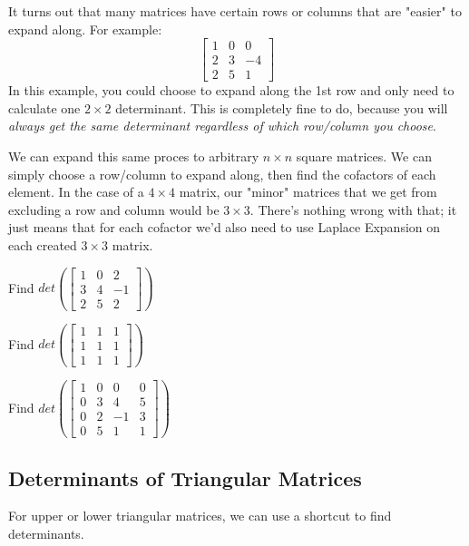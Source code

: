 \documentclass[11pt]{exam}
\begin{document}
    \pagebreak
    It turns out that many matrices have certain rows or columns that are "easier" to expand along. For example:
    $$\begin{bmatrix} 1 & 0 & 0 \\ 2 & 3 & -4 \\ 2 & 5 & 1 \end{bmatrix}$$
    In this example, you could choose to expand along the 1st row and only need to calculate one $2 \times 2$ determinant.
    This is completely fine to do, because you will \textit{always get the same determinant regardless of which row/column you choose}.

    We can expand this same proces to arbitrary $n \times n$ square matrices. We can simply choose a row/column to expand along, then find the cofactors
    of each element. In the case of a $4 \times 4$ matrix, our "minor" matrices that we get from excluding a row and column would be $3 \times 3$.
    There's nothing wrong with that; it just means that for each cofactor we'd also need to use Laplace Expansion on each created $3 \times 3$ matrix.

    \vspace{20px}
    \begin{questions}
        \item Find $det(\begin{bmatrix} 1 & 0 & 2 \\ 3 & 4 & -1 \\ 2 & 5 & 2 \end{bmatrix})$
        \item Find $det(\begin{bmatrix} 1 & 1 & 1 \\ 1 & 1 & 1 \\ 1 & 1 & 1 \end{bmatrix})$
        \item Find $det(\begin{bmatrix} 1 & 0 & 0 & 0 \\ 0 & 3 & 4 & 5 \\ 0 & 2 & -1 & 3 \\ 0 & 5 & 1 & 1 \end{bmatrix})$
    \end{questions}

    \pagebreak
    \subsection{Determinants of Triangular Matrices}
    For upper or lower triangular matrices, we can use a shortcut to find determinants.
\end{document}
